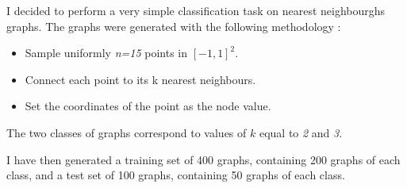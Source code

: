 \documentclass[a4paper,11pt]{article}
\begin{document}
I decided to perform a very simple classification task on nearest neighbourghs graphs. 
The graphs were generated with the following methodology : \\
\begin{itemize}
    \item Sample uniformly \textit{n=15} points in $[-1, 1]^2$. 
    \item Connect each point to its k nearest neighbours.
    \item Set the coordinates of the point as the node value. \\
\end{itemize}

The two classes of graphs correspond to values of $k$ equal to \textit{2} and \textit{3}.

I have then generated a training set of 400 graphs, containing 200 graphs of each class, and a test set of 100 graphs, containing 50 graphs of each class.\\
\end{document}
